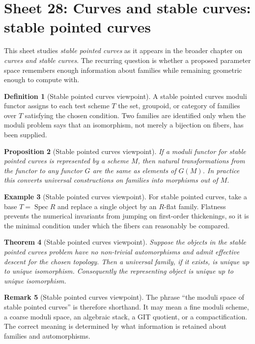 \documentclass[11pt]{amsart}
\newtheorem{theorem}{Theorem}[section]
\newtheorem{proposition}[theorem]{Proposition}
\theoremstyle{definition}
\newtheorem{definition}[theorem]{Definition}
\newtheorem{example}[theorem]{Example}
\newtheorem{remark}[theorem]{Remark}
\newcommand{\Spec}{\operatorname{Spec}}
\begin{document}
\section{Sheet 28: Curves and stable curves: stable pointed curves}
This sheet studies \emph{stable pointed curves} as it appears in the broader chapter on \emph{curves and stable curves}.  The recurring question is whether a proposed parameter space remembers enough information about families while remaining geometric enough to compute with.
\begin{definition}[Stable pointed curves viewpoint]
A stable pointed curves moduli functor assigns to each test scheme $T$ the set, groupoid, or category of families over $T$ satisfying the chosen condition.  Two families are identified only when the moduli problem says that an isomorphism, not merely a bijection on fibers, has been supplied.
\end{definition}
\begin{proposition}[Stable pointed curves viewpoint]
If a moduli functor for stable pointed curves is represented by a scheme $M$, then natural transformations from the functor to any functor $G$ are the same as elements of $G(M)$.  In practice this converts universal constructions on families into morphisms out of $M$.
\end{proposition}
\begin{example}[Stable pointed curves viewpoint]
For stable pointed curves, take a base $T=\Spec R$ and replace a single object by an $R$-flat family.  Flatness prevents the numerical invariants from jumping on first-order thickenings, so it is the minimal condition under which the fibers can reasonably be compared.
\end{example}
\begin{theorem}[Stable pointed curves viewpoint]
Suppose the objects in the stable pointed curves problem have no non-trivial automorphisms and admit effective descent for the chosen topology.  Then a universal family, if it exists, is unique up to unique isomorphism.  Consequently the representing object is unique up to unique isomorphism.
\end{theorem}
\begin{remark}[Stable pointed curves viewpoint]
The phrase ``the moduli space of stable pointed curves'' is therefore shorthand.  It may mean a fine moduli scheme, a coarse moduli space, an algebraic stack, a GIT quotient, or a compactification.  The correct meaning is determined by what information is retained about families and automorphisms.
\end{remark}
\end{document}
